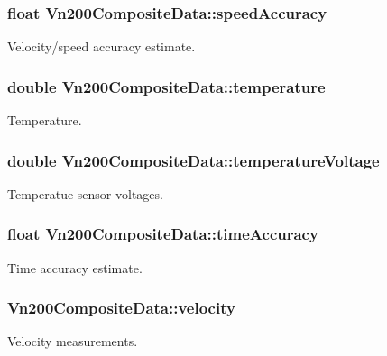 \subsubsection[{\texorpdfstring{speed\+Accuracy}{speedAccuracy}}]{\setlength{\rightskip}{0pt plus 5cm}float Vn200\+Composite\+Data\+::speed\+Accuracy}\hypertarget{structVn200CompositeData_ab3c241777e887510c18c944c713eb8a3}{}\label{structVn200CompositeData_ab3c241777e887510c18c944c713eb8a3}
Velocity/speed accuracy estimate. 
\subsubsection[{\texorpdfstring{temperature}{temperature}}]{\setlength{\rightskip}{0pt plus 5cm}double Vn200\+Composite\+Data\+::temperature}\hypertarget{structVn200CompositeData_a3354f4053890e5c3edc22176b513ec02}{}\label{structVn200CompositeData_a3354f4053890e5c3edc22176b513ec02}
Temperature. 
\subsubsection[{\texorpdfstring{temperature\+Voltage}{temperatureVoltage}}]{\setlength{\rightskip}{0pt plus 5cm}double Vn200\+Composite\+Data\+::temperature\+Voltage}\hypertarget{structVn200CompositeData_a54ab3cb50923a9748d5550e4890627b7}{}\label{structVn200CompositeData_a54ab3cb50923a9748d5550e4890627b7}
Temperatue sensor voltages. 
\subsubsection[{\texorpdfstring{time\+Accuracy}{timeAccuracy}}]{\setlength{\rightskip}{0pt plus 5cm}float Vn200\+Composite\+Data\+::time\+Accuracy}\hypertarget{structVn200CompositeData_a11c014a5f2a8634e12ac59d7ad3d75f9}{}\label{structVn200CompositeData_a11c014a5f2a8634e12ac59d7ad3d75f9}
Time accuracy estimate. 
\subsubsection[{\texorpdfstring{velocity}{velocity}}]{ Vn200\+Composite\+Data\+::velocity}\hypertarget{structVn200CompositeData_a1dc5d5ec41470c01765c925c1d8d876c}{}\label{structVn200CompositeData_a1dc5d5ec41470c01765c925c1d8d876c}
Velocity measurements. 
